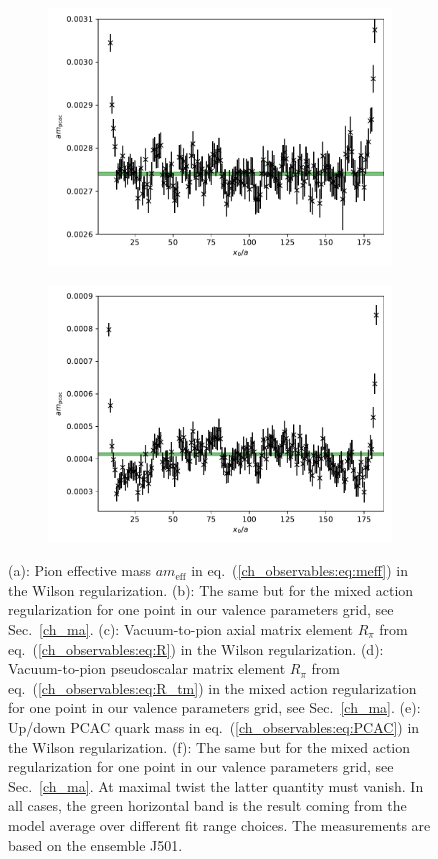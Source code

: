 \begin{figure}
\begin{subfigure}{.49\textwidth}
    	\includegraphics[width=\textwidth]{./cap3/figs/J501_mpcac.pdf}
    	\caption{}
    \end{subfigure}
    \begin{subfigure}{.49\textwidth}
    	\includegraphics[width=\textwidth]{./cap3/figs/J501_mpcac_tm.pdf}
    	\caption{}
    \end{subfigure}
    \caption{(a): Pion effective mass $am_{\textrm{eff}}$ in eq.~(\ref{ch_observables:eq:meff}) in the Wilson regularization. (b): The same but for the mixed action regularization for one point in our valence parameters grid, see Sec.~\ref{ch_ma}. (c): Vacuum-to-pion axial matrix element $R_{\pi}$ from eq.~(\ref{ch_observables:eq:R}) in the Wilson regularization. (d): Vacuum-to-pion pseudoscalar matrix element $R_{\pi}$ from eq.~(\ref{ch_observables:eq:R_tm}) in the mixed action regularization for one point in our valence parameters grid, see Sec.~\ref{ch_ma}. (e): Up/down PCAC quark mass in eq.~(\ref{ch_observables:eq:PCAC}) in the Wilson regularization. (f): The same but for the mixed action regularization for one point in our valence parameters grid, see Sec.~\ref{ch_ma}. At maximal twist the latter quantity must vanish. In all cases, the green horizontal band is the result coming from the model average over different fit range choices. The measurements are based on the ensemble J501.}

\end{figure}
